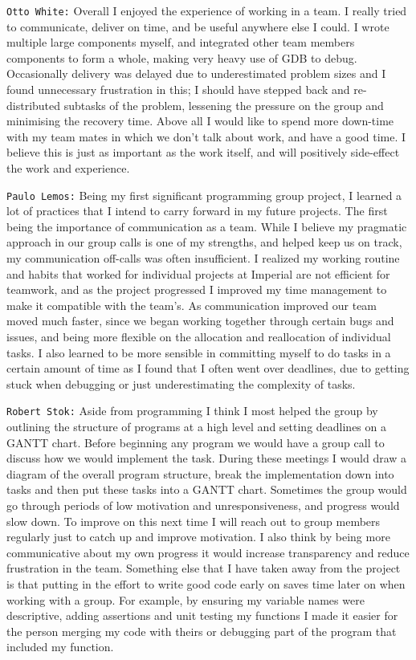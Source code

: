 \documentclass[11pt]{article}
\begin{document}
\texttt{Otto White:} Overall I enjoyed the experience of working in a team. I really tried to communicate, deliver on time, and be useful anywhere else I could. I wrote multiple large components myself, and integrated other team members components to form a whole, making very heavy use of GDB to debug. Occasionally delivery was delayed due to underestimated problem sizes and I found unnecessary frustration in this; I should have stepped back and re-distributed subtasks of the problem, lessening the pressure on the group and minimising the recovery time. Above all I would like to spend more down-time with my team mates in which we don’t talk about work, and have a good time. I believe this is just as important as the work itself, and will positively side-effect the work and experience.

\texttt{Paulo Lemos:} Being my first significant programming group project, I learned a lot of practices that I intend to carry forward in my future projects. The first being the importance of communication as a team. While I believe my pragmatic approach in our group calls is one of my strengths, and helped keep us on track, my communication off-calls was often insufficient. I realized my working routine and habits that worked for individual projects at Imperial are not efficient for teamwork, and as the project progressed I improved my time management to make it compatible with the team’s. As communication improved our team moved much faster, since we began working together through certain bugs and issues, and being more flexible on the allocation and reallocation of individual tasks. I also learned to be more sensible in committing myself to do tasks in a certain amount of time as I found that I often went over deadlines, due to getting stuck when debugging or just underestimating the complexity of tasks. 

\texttt{Robert Stok:} Aside from programming I think I most helped the group by outlining the structure of programs at a high level and setting deadlines on a GANTT chart. Before beginning any program we would have a group call to discuss how we would implement the task. During these meetings I would draw a diagram of the overall program structure, break the implementation down into tasks and then put these tasks into a GANTT chart. Sometimes the group would go through periods of low motivation and unresponsiveness, and progress would slow down. To improve on this next time I will reach out to group members regularly just to catch up and improve motivation. I also think by being more communicative about my own progress it would increase transparency and reduce frustration in the team. Something else that I have taken away from the project is that putting in the effort to write good code early on saves time later on when working with a group. For example, by ensuring my variable names were descriptive, adding assertions and unit testing my functions I made it easier for the person merging my code with theirs or debugging part of the program that included my function.
 
\end{document}
